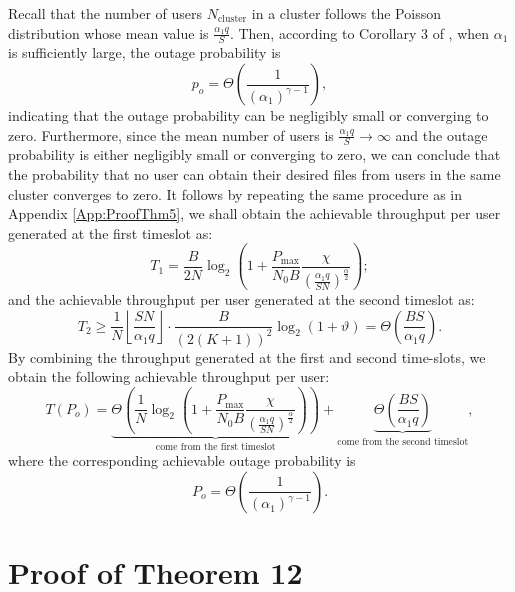\documentclass[journal,draftclsnofoot,onecolumn,12pt,twoside]{IEEEtran}
\begin{document}
Recall that the number of users $N_{\text{cluster}}$ in a cluster follows the Poisson distribution whose mean value is $\frac{\alpha_1q}{S}$. Then, according to Corollary 3 of \cite{lee2020optimal}, when $\alpha_1$ is sufficiently large, the outage probability is
\begin{equation}
p_o=\Theta\left(\frac{1}{(\alpha_1)^{\gamma-1}}\right),
\end{equation}
indicating that the outage probability can be negligibly small or converging to zero. Furthermore, since the mean number of users is $\frac{\alpha_1q}{S}\to \infty$ and the outage probability is either negligibly small or converging to zero, we can conclude that the probability that no user can obtain their desired files from users in the same cluster converges to zero. It follows by repeating the same procedure as in Appendix \ref{App:ProofThm5}, we shall obtain the achievable throughput per user generated at the first timeslot as:
\begin{equation}
T_1=\frac{B}{2N}\log_2\left(1+\frac{P_{\text{max}}}{N_0B}\frac{\chi}{\left(\frac{\alpha_1 q}{SN}\right)^\frac{\alpha}{2}}\right);
\end{equation}
and the achievable throughput per user generated at the second timeslot as:
\begin{equation}
T_2\geq\frac{1}{N}\left\lfloor\frac{SN}{\alpha_1 q}\right\rfloor\cdot\frac{B}{(2(K+1))^2}\log_2\left(1+\vartheta\right)=\Theta\left(\frac{BS}{\alpha_1 q}\right).
\end{equation}
By combining the throughput generated at the first and second time-slots, we obtain the following achievable throughput per user:
\begin{equation}
T(P_o)=\underbrace{\Theta\left(\frac{1}{N}\log_2\left(1+\frac{P_{\text{max}}}{N_0B}\frac{\chi}{\left(\frac{\alpha_1 q}{SN}\right)^\frac{\alpha}{2}}\right)\right)}_{\text{come from the first timeslot}}+\underbrace{\Theta\left(\frac{BS}{\alpha_1 q}\right)}_{\text{come from the second timeslot}},
\end{equation}
where the corresponding achievable outage probability is 
\begin{equation}
P_o= \Theta\left(\frac{1}{(\alpha_1)^{\gamma-1}}\right).
\end{equation}

\section{Proof of Theorem 12}

\label{App:ProofThm12}
\end{document}
